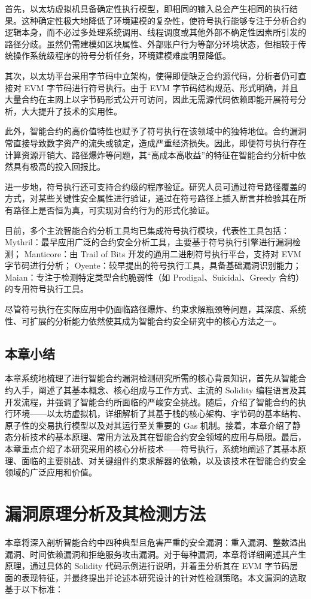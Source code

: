 \documentclass[print, master, vlined, timesmath]{DissertUESTC}
\begin{document}
首先，以太坊虚拟机具备确定性执行模型，即相同的输入总会产生相同的执行结果。这种确定性极大地降低了环境建模的复杂性，使符号执行能够专注于分析合约逻辑本身，而不必过多处理系统调用、线程调度或其他外部不确定性因素所引发的路径分歧。虽然仍需建模如区块属性、外部账户行为等部分环境状态，但相较于传统操作系统级程序的符号分析任务，环境建模难度明显降低。

其次，以太坊平台采用字节码中立架构，使得即便缺乏合约源代码，分析者仍可直接对 EVM 字节码进行符号执行。由于 EVM 字节码结构规范、形式明确，并且大量合约在主网上以字节码形式公开可访问，因此无需源代码依赖即能开展符号分析，大大提升了技术的实用性。

此外，智能合约的高价值特性也赋予了符号执行在该领域中的独特地位。合约漏洞常直接导致数字资产的流失或锁定，造成严重经济损失。因此，即便符号执行存在计算资源开销大、路径爆炸等问题，其“高成本高收益”的特征在智能合约分析中依然具有极高的投入回报比。


进一步地，符号执行还可支持合约级的程序验证。研究人员可通过符号路径覆盖的方式，对某些关键性安全属性进行验证，通过在符号路径上插入断言并检验其在所有路径上是否恒为真，可实现对合约行为的形式化验证。

目前，多个主流智能合约分析工具均已集成符号执行模块，代表性工具包括：
Mythril：最早应用广泛的合约安全分析工具，主要基于符号执行引擎进行漏洞检测；
Manticore：由 Trail of Bits 开发的通用二进制符号执行平台，支持对 EVM 字节码进行分析；
Oyente：较早提出的符号执行工具，具备基础漏洞识别能力；
Maian：专注于检测特定类型合约脆弱性（如 Prodigal、Suicidal、Greedy 合约）的专用符号执行工具。

尽管符号执行在实际应用中仍面临路径爆炸、约束求解瓶颈等问题，其深度、系统性、可扩展的分析能力依然使其成为智能合约安全研究中的核心方法之一。
\section{本章小结}
本章系统地梳理了进行智能合约漏洞检测研究所需的核心背景知识，首先从智能合约入手，阐述了其基本概念、核心组成与工作方式、主流的 Solidity 编程语言及其开发流程，并强调了智能合约所面临的严峻安全挑战。随后，介绍了智能合约的执行环境——以太坊虚拟机，详细解析了其基于栈的核心架构、字节码的基本结构、原子性的交易执行模型以及对其运行至关重要的 Gas 机制。接着，本章介绍了静态分析技术的基本原理、常用方法及其在智能合约安全领域的应用与局限。最后，本章重点介绍了本研究采用的核心分析技术——符号执行，系统地阐述了其基本原理、面临的主要挑战、对关键组件约束求解器的依赖，以及该技术在智能合约安全领域的广泛应用和价值。
\chapter{漏洞原理分析及其检测方法}
本章将深入剖析智能合约中四种典型且危害严重的安全漏洞：重入漏洞、整数溢出漏洞、时间依赖漏洞和拒绝服务攻击漏洞。对于每种漏洞，本章将详细阐述其产生原理，通过具体的 Solidity 代码示例进行说明，并着重分析其在 EVM 字节码层面的表现特征，并最终提出并论述本研究设计的针对性检测策略。本文漏洞的选取基于以下标准：
\end{document}
